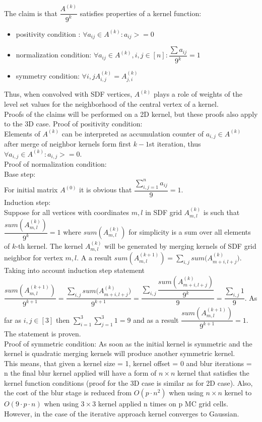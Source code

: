 The claim is that $\dfrac{A^{(k)}}{9^k}$ satisfies properties of a kernel function:
\begin{itemize}
	\item positivity condition : $\forall a_{ij} \in A^{(k)}: a_{ij} >= 0$
	\item normalization condition: $\forall a_{ij} \in A^{(k)}, i,j \in [n]: \dfrac{\sum{a_{ij}}}{9^k} = 1$
	\item symmetry condition: $\forall i,j A^{(k)}_{i,j} = A^{(k)}_{j, i} $
\end{itemize}
Thus, when convolved with SDF vertices, $A^{(k)}$ plays a role of weights of the level set values for the neighborhood of the central vertex of a kernel.\\
Proofs of the claims will be performed on a 2D kernel, but these proofs also apply to the 3D case.
Proof of positivity condition:\\
Elements of $A^{(k)}$ can be interpreted as accumulation counter of $a_{i,j} \in A^{(k)}$ after merge of neighbor kernels form first $k-1$st iteration, thus $\forall a_{i,j} \in A^{(k)}: a_{i,j} >= 0$.\\
Proof of normalization condition: \\
Base step: \\
For initial matrix $A^{(0)}$ it is obvious that $\dfrac{\sum_{i,j = 1}^{n}{a_{ij}}}{9} = 1$.\\
Induction step:\\ 
Suppose for all vertices with coordinates $m,l$ in SDF grid $A^{(k)}_{m,l}$ is such that $\dfrac{sum(A^{(k)}_{m,l})}{9^k} = 1$ where $sum(A^{(k)}_{m,l})$ for simplicity is a sum over all elements of $k$-th kernel. The kernel $A^{(k)}_{m,l}$ will be generated by merging kernels of SDF grid neighbor for vertex ${m,l}$. A a result $sum(A^{(k+1)}_{m,l}) = \sum_{i,j}{sum(A^{(k)}_{m+i,l+j}})$. Taking into account induction step statement $\dfrac{sum(A^{(k+1)}_{m,l})}{9^{k+1}} = \dfrac{\sum_{i,j}{sum(A^{(k)}_{m+i,l+j}})}{9^{k+1}} = \dfrac{\sum_{i,j}{\dfrac{sum(A^{(k)}_{m+i,l+j})}{9^k}}}{9} = \dfrac{\sum_{i,j}{1}}{9}$. As far as $i,j\in [3]$ then $\sum_{i=1}^3 {\sum_{j=1}^3 {1}} = 9$ and as a result $\dfrac{sum(A^{(k+1)}_{m,l})}{9^{k+1}} = 1$. The statement is proven.\\
Proof of symmetric condition:
As soon as the initial kernel is symmetric and the kernel is quadratic merging kernels will produce another symmetric kernel.\\

This means, that given a kernel size = 1, kernel offset = 0 and blur iterations = n the final blur kernel applied will have a form of $ n \times n$ kernel that satisfies the kernel function conditions (proof for the 3D case is similar as for 2D case). Also, the cost of the blur stage is reduced from $O(p \cdot n^2)$ when using $n \times n$ kernel to $O(9 \cdot p \cdot n)$ when using $3\times 3$ kernel applied n times on p MC grid cells. However, in the case of the iterative approach kernel converges to Gaussian.


